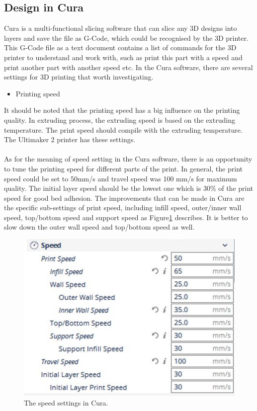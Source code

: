 \subsection{Design in Cura}
Cura is a multi-functional slicing software that can slice any 3D designs into layers and save the file as G-Code, which could be recognised by the 3D printer. This G-Code file as a text document contains a list of commands for the 3D printer to understand and work with, such as print this part with a speed and print another part with another speed etc. In the Cura software, there are several settings for 3D printing that worth investigating.
\begin{itemize}
\item Printing speed
\end{itemize}
It should be noted that the printing speed has a big influence on the printing quality. In extruding process, the extruding speed is based on the extruding temperature. The print speed should compile with the extruding temperature. The Ultimaker 2 printer has these settings. \\
\\
As for the meaning of speed setting in the Cura software, there is an opportunity to tune the printing speed for different parts of the print. In general, the print speed could be set to 50mm/s and travel speed was 100 mm/s for maximum quality. The initial layer speed should be the lowest one which is 30\% of the print speed for good bed adhesion. The improvements that can be made in Cura are the specific sub-settings of print speed, including infill speed, outer/inner wall speed, top/bottom speed and support speed as Figure\ref{Fig:speed} describes. It is better to slow down the outer wall speed and top/bottom speed as well.
\begin{figure}[htbp]
  \centering
  \includegraphics[scale=0.8]{Figs5//speed.JPG}
  \caption[The speed settings in Cura]{\footnotesize The speed settings in Cura.}
  \label{Fig:speed}
\end{figure}

